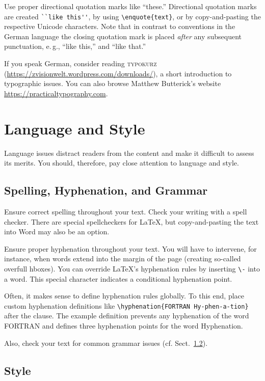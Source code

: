 Use proper directional quotation marks like ``these.'' Directional quotation marks are created  \verb|``like this''|, by using \verb|\enquote{text}|, or by copy-and-pasting the respective Unicode characters. Note that in contrast to conventions in the German language the closing quotation mark is placed \emph{after} any subsequent punctuation, e.\,g., ``like this,'' and ``like that.''

If you speak German, consider reading \textsc{typokurz} (\url{https://zvisionwelt.wordpress.com/downloads/}), a short introduction to typographic issues. You can also browse Matthew Butterick's website \url{https://practicaltypography.com}.

\section{Language and Style}

Language issues distract readers from the content and make it difficult to assess its merits. You should, therefore, pay close attention to language and style.

\subsection{Spelling, Hyphenation, and Grammar}

Ensure correct spelling throughout your text. Check your writing with a spell checker. There are special spellcheckers for LaTeX, but copy-and-pasting the text into Word may also be an option.

Ensure proper hyphenation throughout your text. You will have to intervene, for instance, when words extend into the margin of the page (creating so-called overfull hboxes). You can override LaTeX's hyphenation rules by inserting \verb|\-| into a word. This special character indicates a conditional hyphenation point.

Often, it makes sense to define hyphenation rules globally. To this end, place custom hyphenation definitions like \verb|\hyphenation{FORTRAN Hy-phen-a-tion}| after the \verb|| clause. The example definition prevents any hyphenation of the word FORTRAN and defines three hyphenation points for the word Hyphenation.

Also, check your text for common grammar issues (cf. Sect.~\ref{sec:style}).

\subsection{Style}
\label{sec:style}

